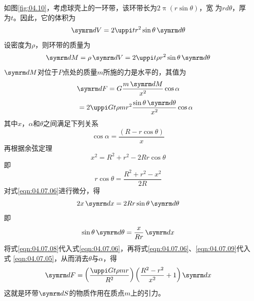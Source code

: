 如图\ref{fig:04.10}，考虑球壳上的一环带，该环带长为$ 2 \uppi \left( r \sin \theta \right) $，宽
为$ r d \theta $，厚为$ t $。因此，它的体积为
\begin{equation*}
 \dif V = 2 \uppi t r ^ { 2 } \sin \theta \dif \theta
\end{equation*}
设密度为$ \rho $，则环带的质量为
\begin{equation*}
 \dif M = \rho \dif V = 2 \uppi t \rho r ^ { 2 } \sin \theta \dif \theta
\end{equation*}
$ \dif M $对位于$ P $点处的质量$ m $所施的力是水平的，其值为
\begin{equation*}
        \dif F = G \frac { m \dif M } { x ^ { 2 } } \cos \alpha \\
\end{equation*}
\begin{equation}\label{eqn:04.07.05}
        \mbox{} \qquad = 2 \uppi G t \rho m r ^ { 2 } \frac { \sin \theta \dif \theta } { x ^ { 2 } } \cos \alpha
\end{equation}
其中$ x $，$ \alpha $和$ \theta $之间满足下列关系
\begin{equation}\label{eqn:04.07.06}
 \cos \alpha = \frac { \left( R - r \cos \theta \right) } { x }
\end{equation}
再根据余弦定理
\begin{equation}\label{eqn:04.07.07}
 x ^ { 2 } = R ^ { 2 } + r ^ { 2 } - 2 R r \cos \theta
\end{equation}
即
\begin{equation}\label{eqn:04.07.08}
 r \cos \theta = \frac { R ^ { 2 } + r ^ { 2 } - x ^ { 2 } } { 2 R }
\end{equation}
对式\eqref{eqn:04.07.06}进行微分，得
\begin{equation*}
 2 x \dif x = 2 R r \sin \theta \dif \theta
\end{equation*}
即
\begin{equation}\label{eqn:04.07.09}
 \sin \theta \dif \theta = \frac { x } { R r } \dif x
\end{equation}
将式\eqref{eqn:04.07.08}代入式\eqref{eqn:04.07.06}，再将式\eqref{eqn:04.07.06}、\eqref{eqn:04.07.09}代入式
\eqref{eqn:04.07.05}，从而消去$ \theta $与$ \alpha $，得
\begin{equation}\label{eqn:04.07.10}
 \dif F = \left( \frac { \uppi G t \rho m r } { R ^ { 2 } } \right) \left( \frac { R ^ { 2 } - r ^ { 2 } } { x ^ { 2 } } + 1 \right) \dif x
\end{equation}
这就是环带$ \dif S $的物质作用在质点$ m $上的引力。

